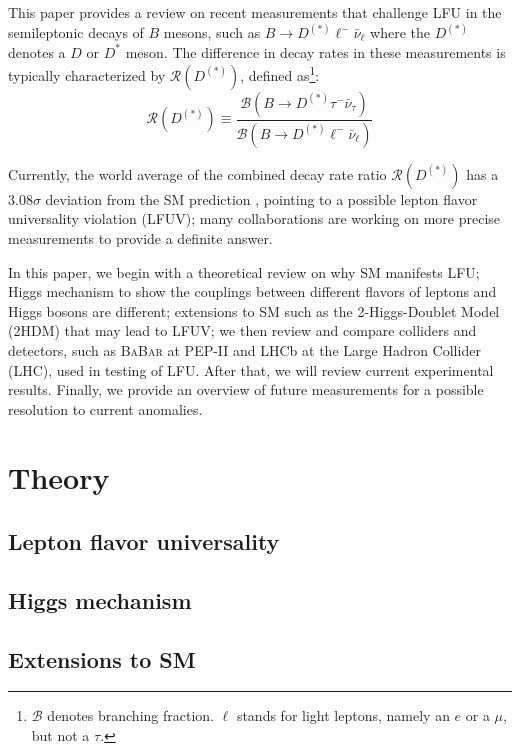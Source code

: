\documentclass[12pt,letterpaper]{article}
\def\BaBar/{\textsc{BaBar}}
\def\RDDst/{\ensuremath{\mathcal{R}(D^{(*)})}}
\def\DDst/{\ensuremath{D^{(*)}}}
\def\Dst/{\ensuremath{D^*}}
\newcommand{\BMesonMode}[2]{\ensuremath{
    B \rightarrow #2 #1^- \bar{\nu}_#1
}}
\newcommand{\BDDstMode}[1]{\BMesonMode{#1}{\DDst/}}
\begin{document}
This paper provides a review on recent measurements that challenge LFU
in the semileptonic decays of $B$ mesons, such as
\BDDstMode{\ell} where the \DDst/ denotes a $D$ or \Dst/ meson.
The difference in decay rates in these measurements is typically characterized
by \RDDst/, defined as\footnote{
    $\mathcal{B}$ denotes branching fraction.
    $\ell$ stands for light leptons, namely an $e$ or a $\mu$, but not a $\tau$.
}:
\begin{equation}
    \RDDst/ \equiv \frac{
        \mathcal{B}\left( \BDDstMode{\tau} \right)
    }{
        \mathcal{B}\left( \BDDstMode{\ell} \right)
    }
\end{equation}

Currently, the world average of the combined decay rate ratio \RDDst/
has a $3.08\sigma$ deviation from the SM prediction \cite{HFLAV:2019}, pointing
to a possible lepton flavor universality violation (LFUV);
many collaborations are working on more precise measurements to provide a
definite answer.

In this paper, we begin with a theoretical review on why SM manifests LFU;
Higgs mechanism to show the couplings between different flavors of leptons and
Higgs bosons are different;
extensions to SM such as the 2-Higgs-Doublet Model (2HDM) that may lead to LFUV;
we then review and compare colliders and detectors, such as \BaBar/ at PEP-II
and LHCb at the Large Hadron Collider (LHC), used in testing of LFU.
After that, we will review current experimental results.
Finally, we provide an overview of future measurements for a possible resolution
to current anomalies.

\section{Theory}
\subsection{Lepton flavor universality} \label{sec:lfu}


\subsection{Higgs mechanism}


\subsection{Extensions to SM}

\end{document}

